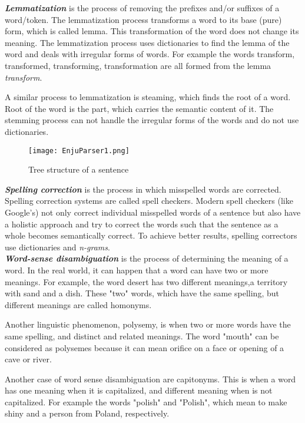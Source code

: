 \emph{\textbf{Lemmatization}} is the process of removing the prefixes and/or suffixes of a word/token. The lemmatization process transforms a word to its base (pure) form, which is called lemma. This transformation of the word does not change its meaning. The lemmatization process uses dictionaries to find the lemma of the word and deals with irregular forms of words. For example the words transform, transformed, transforming, transformation are all formed from the lemma \emph{transform}.

A similar process to lemmatization is steaming, which finds the root of a word.  Root of the word is the part, which carries the semantic content of it. The stemming process can not handle the irregular forms of the words and do not use dictionaries.\\ %

\begin{figure}[ht]
   \begin{center}
	 \texttt{[image: EnjuParser1.png]}
 	 \caption[Tree structure of a sentence]{Tree structure of a sentence}
	 \label{Figure 3}
   \end{center}
\end{figure}

\emph{\textbf{Spelling correction}} is the process in which misspelled words are corrected. Spelling correction systems are called spell checkers. Modern spell checkers (like Google's) not only correct individual misspelled words of a sentence but also have a holistic approach and try to correct the words such that the sentence as a whole becomes semantically correct. To achieve better results, spelling correctors use dictionaries and \emph{n-grams}.\\

\emph{\textbf{Word-sense disambiguation}} is the process of determining the meaning of a word. In the real world, it can happen that a word can have two or more meanings. For example, the word desert has two different meanings,a territory with sand and a dish. These "two" words, which have the same spelling, but different meanings are called homonyms.

Another linguistic phenomenon, polysemy, is when two or more words have the same spelling, and distinct and related meanings. The word "mouth" can be considered as polysemes because it can mean orifice on a face or opening of a cave or river.

Another case of word sense disambiguation are capitonyms. This is when a word has one meaning when it is capitalized, and different meaning when is not capitalized. For example the words "polish" and "Polish", which mean to make shiny and a person from Poland, respectively. \\

